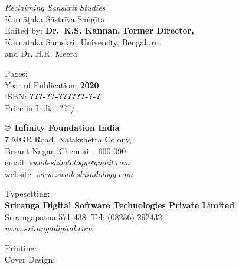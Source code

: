 \thispagestyle{empty}

\noindent
{\fontsize{9}{11}\selectfont\sl Reclaiming Sanskrit Studies}\\
Karnāṭaka Śāstrīya Saṅgīta\\
Edited by: {\bf Dr.\ K.S. Kannan, Former Director,}\\
Karnataka Samskrit University, Bengaluru.\\
and Dr. H.R. Meera
\vfill

\noindent
Pages: {\bf\pageref{bookend}}\\
Year of Publication: {\bf 2020}\\
ISBN: {\bf ???-??-??????-?-?}\\
Price in India: ???/-
\vfill

\noindent
\copyright\ {\bf Infinity Foundation India}\\ 
7 MGR Road, Kalakshetra Colony,\\ 
Besant Nagar, Chennai -- 600 090\\
email: {\sl swadeshindology@gmail.com}\\
website: {\sl www.swadeshiindology.com} 
\vfill

\noindent
Typesetting:\\ 
{\bf Sriranga Digital Software Technologies Private Limited}\\ 
Srirangapatna 571 438. Tel: (08236)-292432.\\
{\sl www.srirangadigital.com}
\vfill

\noindent
Printing:\\

\noindent
Cover Design:\\ 

